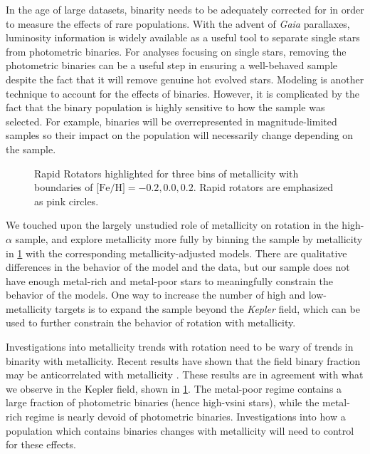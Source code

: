 \documentclass[preprint2]{aastex62}
\newcommand{\Kepler}{\mbox{\textit{Kepler}}}
\newcommand{\Gaia}{\mbox{\textit{Gaia}}}
\newcommand{\feh}{\textrm{[Fe/H]}}
\begin{document}
In the age of large datasets, binarity needs to be adequately corrected for in
order to measure the effects of rare populations. With the advent of
\Gaia{} parallaxes, luminosity information is widely available as a useful 
tool to separate single stars from photometric binaries. For analyses focusing 
on single stars, removing the photometric binaries can be a 
useful step in ensuring a well-behaved sample despite the fact that it will 
remove genuine hot evolved stars. Modeling is another technique to 
account for the effects of binaries. However, it is complicated by the fact that 
the binary population is highly sensitive to how the sample was selected. For 
example, binaries will be overrepresented in magnitude-limited samples 
\citep{Simonian19} so their impact on the population will necessarily change 
depending on the sample.

\begin{figure}[htb]
    \centering
    \caption{Rapid Rotators highlighted for three bins of metallicity with
        boundaries of \(\feh=-0.2, 0.0, 0.2\). Rapid rotators are emphasized as
        pink circles.}
    \label{fig:metallicity}
\end{figure}

We touched upon the largely unstudied role of metallicity on rotation in the
high-\(\alpha\) sample, and explore metallicity more fully by binning the sample by metallicity in 
\cref{fig:metallicity} with the corresponding metallicity-adjusted 
\citet{vanSaders13} models. There are qualitative differences in the behavior 
of the model and the data, but our sample does not have enough metal-rich and 
metal-poor stars to meaningfully constrain the behavior of the models. One way 
to increase the number of high and low-metallicity targets is to expand the sample 
beyond the \Kepler{} field, which can be used to further constrain the behavior 
of rotation with metallicity.

Investigations into metallicity trends with rotation need to be wary of trends
in binarity with metallicity. Recent results have shown that the field binary
fraction may be anticorrelated with metallicity \citep{ElBadry19,Moe19}. These
results are in agreement with what we observe in the Kepler field, shown in
\cref{fig:metallicity}. The metal-poor regime contains a large fraction
of photometric binaries (hence high-vsini stars), while the metal-rich regime
is nearly devoid of photometric binaries. Investigations into how a population
which contains binaries changes with metallicity will need to control for these
effects.
\end{document}
